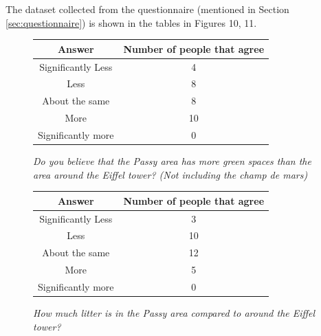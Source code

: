 \documentclass[11pt,letterpaper]{article}
\begin{document}
The dataset collected from the questionnaire (mentioned in Section \ref{sec:questionnaire}) is shown in the tables in Figures 10, 11.

\begin{figure}[H]
    \begin{center}
        \begin{tabular}{||c c||}
            \hline
            Answer             & Number of people that agree \\ [0.5ex]
            \hline\hline
            Significantly Less & 4                           \\
            \hline
            Less               & 8                           \\
            \hline
            About the same     & 8                           \\
            \hline
            More               & 10                          \\
            \hline
            Significantly more & 0                           \\ [1ex]
            \hline
        \end{tabular}
    \end{center}
    \caption{\textit{Do you believe that the Passy area has more green spaces than the area around the Eiffel tower? (Not including the champ de mars)}}
\end{figure}

\begin{figure}[H]
    \begin{center}
        \begin{tabular}{||c c||}
            \hline
            Answer             & Number of people that agree \\ [0.5ex]
            \hline\hline
            Significantly Less & 3                           \\
            \hline
            Less               & 10                           \\
            \hline
            About the same     & 12                           \\
            \hline
            More               & 5                          \\
            \hline
            Significantly more & 0                           \\ [1ex]
            \hline
        \end{tabular}
    \end{center}
    \caption{\textit{How much litter is in the Passy area compared to around the Eiffel tower?}}
\end{figure}
\end{document}
